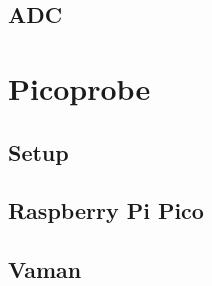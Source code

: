 \documentclass[11pt]{book}
\begin{document}
\section{ADC}

\chapter{Picoprobe}
\section{Setup}

\section{Raspberry Pi Pico}

\section{Vaman}

\backmatter
\appendix
\iffalse
\chapter{Manual}

\fi


\latexprintindex
\end{document}
